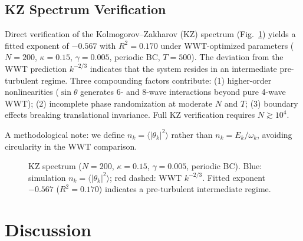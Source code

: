 \documentclass[aps,pre,12pt]{revtex4-2}
\begin{document}
\subsection{KZ Spectrum Verification}

Direct verification of the Kolmogorov--Zakharov (KZ) spectrum (Fig.~\ref{fig:kz}) yields a fitted exponent of $-0.567$ with $R^2 = 0.170$ under WWT-optimized parameters ($N=200$, $\kappa=0.15$, $\gamma=0.005$, periodic BC, $T=500$). The deviation from the WWT prediction $k^{-2/3}$ indicates that the system resides in an intermediate pre-turbulent regime. Three compounding factors contribute: (1) higher-order nonlinearities ($\sin\theta$ generates 6- and 8-wave interactions beyond pure 4-wave WWT); (2) incomplete phase randomization at moderate $N$ and $T$; (3) boundary effects breaking translational invariance. Full KZ verification requires $N \gtrsim 10^4$.

A methodological note: we define $n_k = \langle|\theta_k|^2\rangle$ rather than $n_k = E_k/\omega_k$, avoiding circularity in the WWT comparison.

\begin{figure}[htbp]
\centering
{}
\caption{KZ spectrum ($N=200$, $\kappa=0.15$, $\gamma=0.005$, periodic BC). Blue: simulation $n_k=\langle|\theta_k|^2\rangle$; red dashed: WWT $k^{-2/3}$. Fitted exponent $-0.567$ ($R^2=0.170$) indicates a pre-turbulent intermediate regime.}
\label{fig:kz}
\end{figure}

\section{Discussion}
\end{document}
